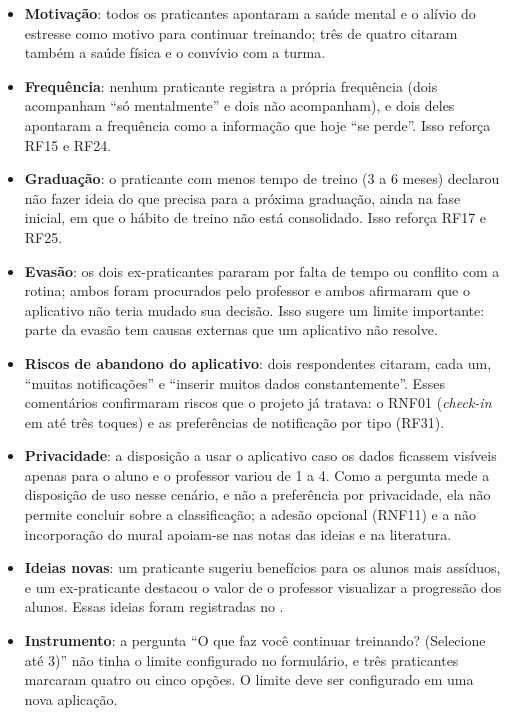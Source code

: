 \begin{itemize}
  \item \textbf{Motivação}: todos os praticantes apontaram a saúde mental
        e o alívio do estresse como motivo para continuar treinando; três
        de quatro citaram também a saúde física e o convívio com a turma.
  \item \textbf{Frequência}: nenhum praticante registra a própria
        frequência (dois acompanham ``só mentalmente'' e dois não
        acompanham), e dois deles apontaram a frequência como a
        informação que hoje ``se perde''. Isso reforça RF15 e RF24.
  \item \textbf{Graduação}: o praticante com menos tempo de treino (3 a 6
        meses) declarou não fazer ideia do que precisa para a próxima
        graduação, ainda na fase inicial, em que o hábito de treino não está
        consolidado. Isso reforça RF17 e RF25.
  \item \textbf{Evasão}: os dois ex-praticantes pararam por falta de tempo
        ou conflito com a rotina; ambos foram procurados pelo professor e
        ambos afirmaram que o aplicativo não teria mudado sua decisão.
        Isso sugere um limite importante: parte da evasão tem causas
        externas que um aplicativo não resolve.
  \item \textbf{Riscos de abandono do aplicativo}: dois respondentes
        citaram, cada um, ``muitas notificações'' e ``inserir muitos dados
        constantemente''. Esses comentários confirmaram riscos que o
        projeto já tratava: o RNF01 (\textit{check-in} em até três toques)
        e as preferências de notificação por tipo (RF31).
  \item \textbf{Privacidade}: a disposição a usar o aplicativo caso os
        dados ficassem visíveis apenas para o aluno e o professor variou
        de 1 a 4. Como a pergunta mede a disposição de uso nesse cenário,
        e não a preferência por privacidade, ela não permite concluir
        sobre a classificação; a adesão opcional (RNF11) e a não
        incorporação do mural apoiam-se nas notas das ideias e na
        literatura.
  \item \textbf{Ideias novas}: um praticante sugeriu benefícios para os
        alunos mais assíduos, e um ex-praticante destacou o valor de o
        professor visualizar a progressão dos alunos. Essas ideias foram
        registradas no .
  \item \textbf{Instrumento}: a pergunta ``O que faz você continuar
        treinando? (Selecione até 3)'' não tinha o limite configurado no
        formulário, e três praticantes marcaram quatro ou cinco opções. O
        limite deve ser configurado em uma nova aplicação.
\end{itemize}

